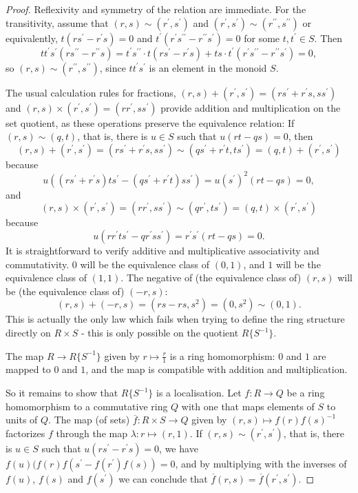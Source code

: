 \documentclass[10pt,a4paper]{amsart}
\begin{document}
\begin{proof}
Reflexivity and symmetry of the relation are immediate. For the transitivity, assume that $(r,s) \sim (r^\prime,s^\prime)$ and $(r^\prime,s^\prime) \sim (r^{\prime\prime},s^{\prime\prime})$ or equivalently, $t(rs^\prime - r^\prime s) = 0$ and $t^\prime(r^\prime s^{\prime\prime} - r^{\prime\prime} s^\prime) = 0$ for some $t, t^\prime \in S$. Then
\[ tt^\prime s^\prime(r s^{\prime\prime} - r^{\prime\prime} s) = t^\prime s^{\prime\prime} \cdot t(rs^\prime - r^\prime s) + ts \cdot t^\prime(r^\prime s^{\prime\prime} - r^{\prime\prime} s^\prime) = 0, \]
so $(r,s) \sim (r^{\prime\prime},s^{\prime\prime})$, since $tt^\prime s^\prime$ is an element in the monoid $S$.

The usual calculation rules for fractions, $(r,s) + (r^\prime, s^\prime) = (r s^\prime + r^\prime s, ss^\prime)$ and $(r,s) \times (r^\prime, s^\prime) = (rr^\prime, ss^\prime)$ provide addition and multiplication on the set quotient, as these operations preserve the equivalence relation: If $(r,s) \sim (q,t)$, that is, there is $u \in S$ such that $u(rt - qs) = 0$, then 
\[ (r,s) + (r^\prime, s^\prime) = (rs^\prime + r^\prime s, ss^\prime) \sim (qs^\prime + r^\prime t, ts^\prime) = (q,t) + (r^\prime, s^\prime) \]
because 
\[ u((rs^\prime + r^\prime s)ts^\prime - (qs^\prime + r^\prime t)ss^\prime) = u(s^\prime)^2(rt - qs) = 0, \]
and 
\[ (r,s) \times (r^\prime, s^\prime) = (rr^\prime, ss^\prime) \sim (qr^\prime, ts^\prime) = (q,t) \times (r^\prime, s^\prime) \]
because
\[ u(rr^\prime ts^\prime - qr^\prime ss^\prime) = r^\prime s^\prime (rt - qs) = 0. \]
It is straightforward to verify additive and multiplicative associativity and commutativity. $0$ will be the equivalence class of $(0,1)$, and $1$ will be the equivalence class of $(1,1)$. The negative of (the equivalence class of) $(r,s)$ will be (the equivalence class of) $(-r,s)$: 
\[ (r,s) + (-r,s) = (rs - rs,s^2) = (0,s^2) \sim (0,1). \]
This is actually the only law which fails when trying to define the ring structure directly on $R \times S$ - this is only possible on the quotient $R\{S^{-1}\}$.

The map $R \rightarrow R\{S^{-1}\}$ given by $r \mapsto \frac{r}{1}$ is a ring homomorphism: $0$ and $1$ are mapped to $0$ and $1$, and the map is compatible with addition and multiplication.

So it remains to show that $R\{S^{-1}\}$ is a localisation. Let $f: R \rightarrow Q$ be a ring homomorphism to a commutative ring $Q$ with one that maps elements of $S$ to units of $Q$. The map (of sets) $\overline{f}: R \times S \rightarrow Q$ given by $(r,s) \mapsto f(r)f(s)^{-1}$ factorizes $f$ through the map $\lambda: r \mapsto (r,1)$. If $(r,s) \sim (r^\prime,s^\prime)$, that is, there is $u \in S$ such that $u(rs^\prime - r^\prime s) = 0$, we have $f(u)(f(r)f(s^\prime - f(r^\prime)f(s)) = 0$, and by multiplying with the inverses of $f(u)$, $f(s)$ and $f(s^\prime)$ we can conclude that
$\overline{f}(r,s) = \overline{f}(r^\prime,s^\prime)$. 


\end{proof}
\end{document}
